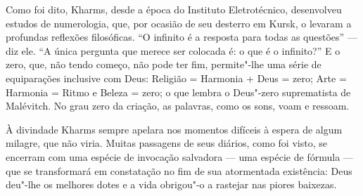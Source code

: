 {{{Como foi dito, Kharms, desde a época do Instituto Eletrotécnico,
desenvolveu estudos de numerologia, que, por ocasião de seu desterro em
Kursk, o levaram a profundas reflexões filosóficas. ``O infinito é a
resposta para todas as questões'' --- diz ele. ``A única pergunta que
merece ser colocada é: o que é o infinito?'' E o zero, que, não tendo
começo, não pode ter fim, permite"-lhe uma série de equiparações
inclusive com Deus: Religião = Harmonia + Deus = zero; Arte = Harmonia =
Ritmo e Beleza = zero; o que lembra o Deus"-zero suprematista de
Malévitch. No grau zero da criação, as palavras, como os sons, voam e
ressoam.

À divindade Kharms sempre apelara nos momentos difíceis à espera de
algum milagre, que não viria. Muitas passagens de seus diários, como foi
visto, se encerram com uma espécie de invocação salvadora --- uma espécie
de fórmula --- que se transformará em constatação no fim de sua
atormentada existência: Deus deu"-lhe os melhores dotes e a vida
obrigou"-o a rastejar nas piores baixezas.









}}}
